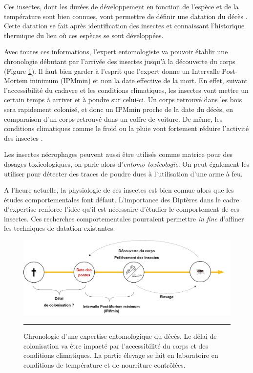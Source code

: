 Ces insectes, dont les durées de développement en fonction de l'espèce et de la température sont bien connues, vont permettre de définir une datation du décès \cite{charabidze_insectes_2014}. Cette datation se fait après identification des insectes et connaissant l'historique thermique du lieu où ces espèces se sont développées. 

Avec toutes ces informations, l'expert entomologiste va pouvoir établir une chronologie débutant par l'arrivée des insectes jusqu'à la découverte du corps (Figure \ref{fig:ipm}). Il faut bien garder à l'esprit que l'expert donne un Intervalle Post-Mortem minimum (IPMmin) et non la date effective de la mort. En effet, suivant l'accessibilité du cadavre et les conditions climatiques, les insectes vont mettre un certain temps à arriver et à pondre sur celui-ci. Un corps retrouvé dans les bois sera rapidement colonisé, et donc un IPMmin proche de la date du décès, en comparaison d'un corps retrouvé dans un coffre de voiture. De même, les conditions climatiques comme le froid ou la pluie vont fortement réduire l'activité des insectes \cite{voss_decomposition_2007}.

Les insectes nécrophages peuvent aussi être utilisés comme matrice pour des dosages toxicologiques, on parle alors d'\textit{entomo-toxicologie}. On peut également les utiliser pour détecter des traces de poudre dues à l'utilisation d'une arme à feu. 

A l'heure actuelle, la physiologie de ces insectes est bien connue alors que les études comportementales font défaut. L'importance des Diptères dans le cadre d'expertise renforce l'idée qu'il est nécessaire d'étudier le comportement de ces insectes. Ces recherches comportementales pourraient permettre \textit{in fine} d'affiner les techniques de datation existantes.

\begin{figure}[ht]
\centering
		\includegraphics[width=0.9 \textwidth]{Figures/IPM.png}
		\rule{35em}{0.5pt}
		\caption[IPM]{Chronologie d'une expertise entomologique du décès. Le délai de colonisation va être impacté par l'accessibilité du corps et des conditions climatiques. La partie élevage se fait en laboratoire en conditions de température et de nourriture contrôlées.}
	\label{fig:ipm}
\end{figure}


